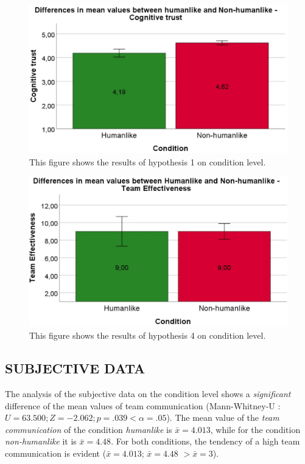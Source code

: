 \documentclass[sigchi]{acmart}
\begin{document}


\begin{figure}[H]
		\begin{footnotesize}
		\centering
			\includegraphics[width=0.7\linewidth]{Abbildungen/H1_Difference.jpg}	
			\caption[The difficulty of the rounds]{This figure shows the results of hypothesis 1 on condition level.}
			\label{H1}
		\end{footnotesize}
	\end{figure}


\begin{figure}[H]
		\begin{footnotesize}
		\centering
			\includegraphics[width=0.7\linewidth]{Abbildungen/H4_Difference.jpg}	
			\caption[The difficulty of the rounds]{This figure shows the results of hypothesis 4 on condition level.}
			\label{H4}
		\end{footnotesize}
	\end{figure}

\subsection{SUBJECTIVE DATA}
The analysis of the subjective data on the condition level shows a \textit{significant} difference of the mean values of team communication (Mann-Whitney-U : $U = 63.500; Z = -2.062; p =.039 < \alpha = .05$). The mean value of the \textit{team communication} of the condition \textit{humanlike} is $\bar{x} = 4.013$, while for the condition \textit{non-humanlike} it is  $\bar{x} = 4.48$. For both conditions, the tendency of a high team communication is evident ($\bar{x} = 4.013$; $\bar{x} = 4.48$ $ > \bar{x} = 3$).
\end{document}
